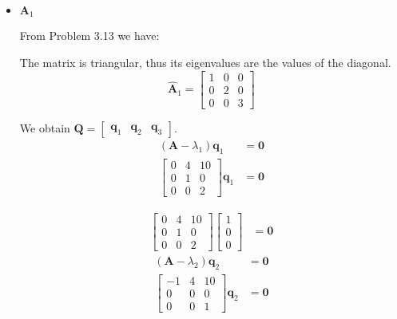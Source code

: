 \begin{itemize}
 \item $\mathbf{A}_1$

 From Problem 3.13 we have:

The matrix is triangular, thus its eigenvalues are the values
 of the diagonal.
 \begin{equation*}
  \hat{\mathbf{A}}_1 = \begin{bmatrix}
                        1 & 0 &0\\0 & 2 & 0\\0 & 0&3
                       \end{bmatrix}
 \end{equation*}

We obtain $\mathbf{Q} = \begin{bmatrix}
                         \mathbf{q}_1 &\mathbf{q}_2 &\mathbf{q}_3
                        \end{bmatrix}
$.
\begin{align*}
 (\mathbf{A}-\lambda_1) \mathbf{q}_1 &= \mathbf{0}\\
 \begin{bmatrix}
    0 & 4 & 10 \\
     0 & 1 & 0 \\
    0 & 0 & 2
    \end{bmatrix}\mathbf{q}_1 &= \mathbf{0}
\end{align*}

\begin{align*}
  \begin{bmatrix}
    0 & 4 & 10 \\
     0 & 1 & 0 \\
    0 & 0 & 2
    \end{bmatrix}
    \begin{bmatrix}
     1 \\ 0 \\ 0
    \end{bmatrix}
    &= \mathbf{0}
\end{align*}
\begin{align*}
 (\mathbf{A}-\lambda_2) \mathbf{q}_2 &= \mathbf{0}\\
 \begin{bmatrix}
    -1 & 4 & 10 \\
     0 & 0 & 0 \\
    0 & 0 & 1
    \end{bmatrix}\mathbf{q}_2 &= \mathbf{0}
\end{align*}


\end{itemize}
